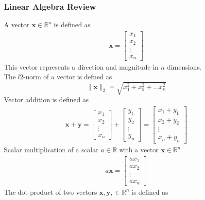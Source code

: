 \subsubsection{Linear Algebra Review}
A vector $\textbf{x} \in \mathbb{R}^n$ is defined as
\begin{align}
  \textbf{x} = 
  \begin{bmatrix}
     x_1 \\
     x_2 \\
     \vdots \\
     x_n
  \end{bmatrix}
\end{align}
This vector represents a direction and magnitude in $n$ dimensions. \\
The $l2$-norm of a vector is defned as
\begin{equation}
  \| \textbf{x} \|_2 = \sqrt{x_1^2 + x_2^2 + \dots x_n^2}
\end{equation}
Vector addition is defined as 
\begin{align}
  \textbf{x} + \textbf{y} = 
  \begin{bmatrix}
     x_1 \\ 
     x_2 \\ 
     \vdots \\
     x_n
  \end{bmatrix}
  + 
  \begin{bmatrix} 
    y_1 \\
    y_2 \\
    \vdots \\
    y_n
  \end{bmatrix}
   = 
   \begin{bmatrix} 
    x_1 + y_1 \\
    x_2 + y_2 \\
    \vdots \\
    x_n + y_n
  \end{bmatrix}
\end{align}
Scalar multiplication of a scalar $a \in \mathbb{R}$ with a vector $\textbf{x} \in \mathbb{R}^n$
\begin{align}
  a \textbf{x} = 
  \begin{bmatrix}
     a x_1 \\
     a x_2 \\
     \vdots \\
     a x_n 
  \end{bmatrix}
\end{align}
The dot product of two vectors $\textbf{x}, \textbf{y}, \in \mathbb{R}^n$ is defined as
